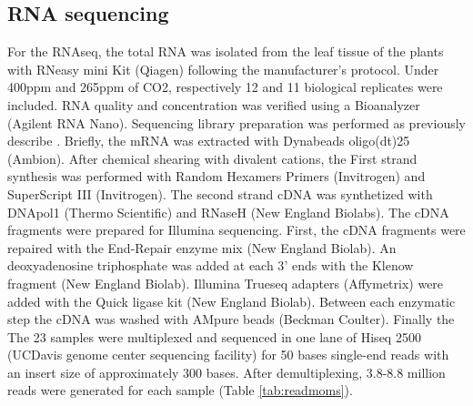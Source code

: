 \documentclass{article}
\begin{document}
\subsection{RNA sequencing} %
For the RNAseq, the total RNA was isolated from the leaf tissue of the plants with
RNeasy mini Kit (Qiagen) following the manufacturer{'}s protocol. Under 400ppm and 265ppm of CO2, respectively 12 and 11 biological replicates were included.  RNA quality and concentration was verified using a Bioanalyzer (Agilent RNA Nano). Sequencing library preparation was performed as previously describe \citep{zhong2011high}. 
Briefly, the mRNA was extracted with Dynabeads oligo(dt)25 (Ambion). After chemical shearing with divalent cations, the First strand synthesis was performed with Random Hexamers Primers (Invitrogen) and SuperScript III (Invitrogen). The second strand cDNA was synthetized with DNApol1 (Thermo Scientific) and RNaseH (New England Biolabs).  
The cDNA fragments were prepared for Illumina sequencing. First, the cDNA fragments were repaired with the End-Repair enzyme mix (New England Biolab). An deoxyadenosine triphosphate was added at each 3{'} ends with the Klenow fragment (New England Biolab). Illumina Trueseq adapters (Affymetrix) were added with the Quick ligase kit (New England Biolab). Between each enzymatic step the cDNA was washed with AMpure beads (Beckman Coulter). Finally the The 23 samples were multiplexed and sequenced in one lane of Hiseq 2500 (UCDavis genome center sequencing facility) for 50 bases single-end reads with an insert size of approximately 300 bases. After demultiplexing, 3.8-8.8 million reads were generated for each sample (Table \ref{tab:readmoms}).
\end{document}
